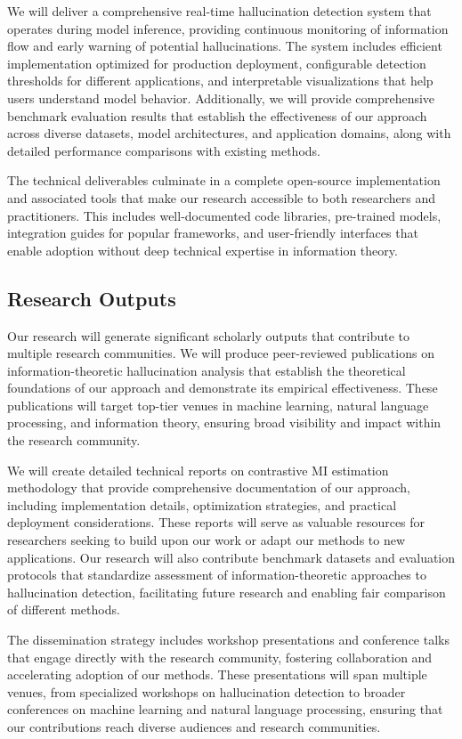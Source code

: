\documentclass[11pt, oneside]{book}
\theoremstyle{plain}
\theoremstyle{definition}
\theoremstyle{remark}
\begin{document}
We will deliver a comprehensive real-time hallucination detection system that operates during model inference, providing continuous monitoring of information flow and early warning of potential hallucinations. The system includes efficient implementation optimized for production deployment, configurable detection thresholds for different applications, and interpretable visualizations that help users understand model behavior. Additionally, we will provide comprehensive benchmark evaluation results that establish the effectiveness of our approach across diverse datasets, model architectures, and application domains, along with detailed performance comparisons with existing methods.

The technical deliverables culminate in a complete open-source implementation and associated tools that make our research accessible to both researchers and practitioners. This includes well-documented code libraries, pre-trained models, integration guides for popular frameworks, and user-friendly interfaces that enable adoption without deep technical expertise in information theory.

\subsection{Research Outputs}

Our research will generate significant scholarly outputs that contribute to multiple research communities. We will produce peer-reviewed publications on information-theoretic hallucination analysis that establish the theoretical foundations of our approach and demonstrate its empirical effectiveness. These publications will target top-tier venues in machine learning, natural language processing, and information theory, ensuring broad visibility and impact within the research community.

We will create detailed technical reports on contrastive MI estimation methodology that provide comprehensive documentation of our approach, including implementation details, optimization strategies, and practical deployment considerations. These reports will serve as valuable resources for researchers seeking to build upon our work or adapt our methods to new applications. Our research will also contribute benchmark datasets and evaluation protocols that standardize assessment of information-theoretic approaches to hallucination detection, facilitating future research and enabling fair comparison of different methods.

The dissemination strategy includes workshop presentations and conference talks that engage directly with the research community, fostering collaboration and accelerating adoption of our methods. These presentations will span multiple venues, from specialized workshops on hallucination detection to broader conferences on machine learning and natural language processing, ensuring that our contributions reach diverse audiences and research communities.
\end{document}
